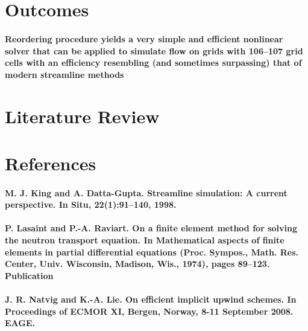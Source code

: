 \documentclass{article}
\begin{document}
\section{Outcomes}
	\paragraph{Reordering procedure yields a very simple and efficient nonlinear solver that can be applied to simulate flow on grids with 106–107 grid cells with an efficiency resembling (and sometimes surpassing) that of modern streamline methods}
	
\section{Literature Review}
	
\section{References}
	\paragraph{M. J. King and A. Datta-Gupta. Streamline simulation: A current perspective. In Situ, 22(1):91–140, 1998.}
	\paragraph{ P. Lasaint and P.-A. Raviart. On a finite element method for solving the neutron transport equation. In Mathematical aspects of finite elements in partial differential equations (Proc. Sympos., Math. Res. Center, Univ. Wisconsin, Madison, Wis., 1974), pages 89–123. Publication}
	\paragraph{J. R. Natvig and K.-A. Lie. On efficient implicit upwind schemes. In Proceedings of ECMOR XI, Bergen, Norway, 8-11  September 2008. EAGE.}
\end{document}

